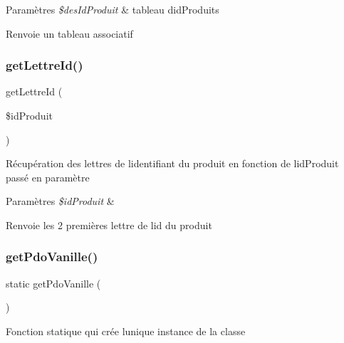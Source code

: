 \begin{DoxyParams}{Paramètres}
{\em \$des\+Id\+Produit} & tableau d\textquotesingle{}id\+Produits \\
\hline
\end{DoxyParams}
\begin{DoxyReturn}{Renvoie}
un tableau associatif 
\end{DoxyReturn}
\mbox{\label{class_pdo_vanille_a606ac81fcbdd73f10715d886fcd63ba4}} 
\subsubsection{\texorpdfstring{get\+Lettre\+Id()}{getLettreId()}}
{\footnotesize\ttfamily get\+Lettre\+Id (\begin{DoxyParamCaption}\item[{}]{\$id\+Produit }\end{DoxyParamCaption})}

Récupération des lettres de l\textquotesingle{}identifiant du produit en fonction de l\textquotesingle{}id\+Produit passé en paramètre


\begin{DoxyParams}{Paramètres}
{\em \$id\+Produit} & \\
\hline
\end{DoxyParams}
\begin{DoxyReturn}{Renvoie}
les 2 premières lettre de l\textquotesingle{}id du produit 
\end{DoxyReturn}
\mbox{\label{class_pdo_vanille_a7a6d58c608b094c2ef43bace45259201}} 
\subsubsection{\texorpdfstring{get\+Pdo\+Vanille()}{getPdoVanille()}}
{\footnotesize\ttfamily static get\+Pdo\+Vanille (\begin{DoxyParamCaption}{ }\end{DoxyParamCaption})\hspace{0.3cm}{\ttfamily [static]}}

Fonction statique qui crée l\textquotesingle{}unique instance de la classe

